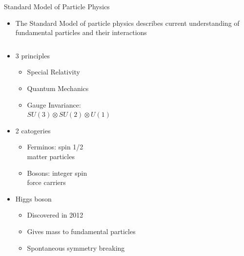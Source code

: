 \documentclass{beamer}
\begin{document}
\begin{frame}{Standard Model of Particle Physics}
    \begin{itemize}
        \item The Standard Model of particle physics describes current understanding of fundamental particles and their interactions
    \end{itemize}
    \begin{columns}
        \begin{column}{0.4\textwidth}
            \begin{itemize}
                \item 3 principles
                \begin{itemize}
                    \item \scriptsize{Special Relativity}
                    \item \scriptsize{Quantum Mechanics}
                    \item \scriptsize{Gauge Invariance:\\$SU(3) \otimes SU(2) \otimes U(1)$}
                \end{itemize}
                \item 2 catogeries
                \begin{itemize}
                    \item \scriptsize{Ferminos: spin 1/2\\matter particles}
                    \item \scriptsize{Bosons: integer spin\\force carriers}
                \end{itemize}
                \item Higgs boson
                \begin{itemize}
                    \item \scriptsize{Discovered in 2012}
                    \item \scriptsize{Gives mass to fundamental particles}
                    \item \scriptsize{Spontaneous symmetry breaking}
                \end{itemize}
            \end{itemize}
        \end{column}
        \begin{column}{0.6\textwidth}
            \begin{figure}

\end{figure}
\end{column}
\end{columns}
\end{frame}
\end{document}
